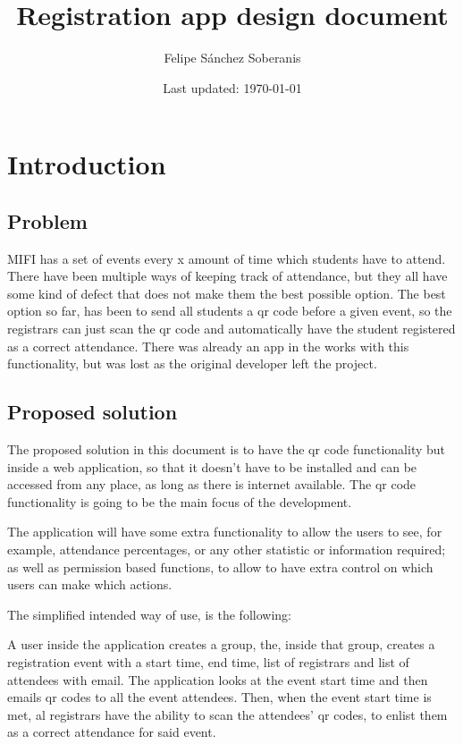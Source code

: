 \documentclass[12pt, letterpaper]{report}
\title{Registration app design document}
\author{Felipe Sánchez Soberanis}
\date{Last updated: \today}
\begin{document}
\maketitle

\tableofcontents

\chapter{Introduction}

\section{Problem}

MIFI has a set of events every x amount of time which students have to attend. There have been multiple ways of keeping track of attendance, but they all have some kind of defect that does not make them the best possible option. The best option so far, has been to send all students a qr code before a given event, so the registrars can just scan the qr code and automatically have the student registered as a correct attendance. There was already an app in the works with this functionality, but was lost as the original developer left the project.

\section{Proposed solution}

The proposed solution in this document is to have the qr code functionality but inside a web application, so that it doesn't have to be installed and can be accessed from any place, as long as there is internet available. The qr code functionality is going to be the main focus of the development.

The application will have some extra functionality to allow the users to see, for example, attendance percentages, or any other statistic or information required; as well as permission based functions, to allow to have extra control on which users can make which actions.

The simplified intended way of use, is the following:

A user inside the application creates a group, the, inside that group, creates a registration event with a start time, end time, list of registrars and list of attendees with email. The application looks at the event start time and then emails qr codes to all the event attendees. Then, when the event start time is met, al registrars have the ability to scan the attendees' qr codes, to enlist them as a correct attendance for said event.
\end{document}

